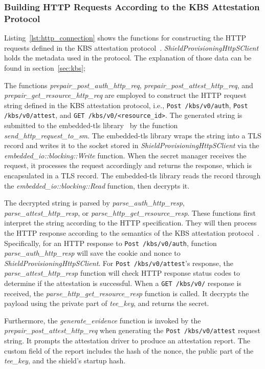 \subsubsection{Building HTTP Requests According to the KBS Attestation Protocol}
Listing~\ref{lst:http_connection} shows the functions for constructing the HTTP requests defined in the KBS attestation protocol~\cite*{kbs_Attestation_protocol}. \emph{ShieldProvisioningHttpSClient} holds the metadata used in the protocol. The explanation of those data can be found in 
section~\ref{sec:kbs};


The functions \emph{prepair\_post\_auth\_http\_req}, \emph{prepair\_post\_attest\_http\_req}, and \emph{prepair\_get\_resource\_http\_req} are employed to construct the HTTP request string defined in the KBS attestation protocol, i.e., \texttt{Post /kbs/v0/auth}, \texttt{Post /kbs/v0/attest}, and
\texttt{GET /kbs/v0/<resource\_id>}. 
The generated string is submitted to the embedded-tls library~\cite*{embede_tls} by the function \emph{send\_http\_request\_to\_sm}. The embedded-tls library wraps the string into a TLS record and writes it to the socket stored in \emph{ShieldProvisioningHttpSClient} via the 
\emph{embedded\_io::blocking::Write} function. When the secret manager receives the request, it processes the request accordingly and returns the response, which is encapsulated in a TLS record. The embedded-tls library reads the record through the 
\emph{embedded\_io::blocking::Read} function, then decrypts it.

The decrypted string is parsed by \emph{parse\_auth\_http\_resp}, \emph{parse\_attest\_http\_resp}, or \emph{parse\_http\_get\_resource\_resp}. These functions first interpret the string according to the HTTP specification. They will then process the HTTP 
response according to the semantics of the KBS attestation protocol~\cite*{kbs_Attestation_protocol}. Specifically, for an HTTP response to \texttt{Post /kbs/v0/auth}, function \emph{parse\_auth\_http\_resp} will save the cookie and nonce to \emph{ShieldProvisioningHttpSClient}. 
For \texttt{Post /kbs/v0/attest}'s response, the \emph{parse\_attest\_http\_resp} function will check HTTP response status codes to determine if the attestation is successful. When a \texttt{GET /kbs/v0/} response is received, the \emph{parse\_http\_get\_resource\_resp} function is called. 
It decrypts the payload using the private part of \emph{tee\_key}, and returns the secret.

Furthermore, the \emph{generate\_evidence} function is invoked by the \emph{prepair\_post\_attest\_http\_req} when generating the \texttt{Post /kbs/v0/attest} request string. It prompts the attestation driver to produce an attestation report. The custom field of the report includes the 
hash of the nonce, the public part of the \emph{tee\_key}, and the shield's startup hash.                                                                                                                                                                                                                                                                                                


